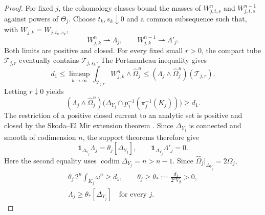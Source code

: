 \documentclass[reqno]{amsart}
\numberwithin{equation}{section}
\theoremstyle{definition}
\begin{document}
\begin{proof}
For fixed $j$, the cohomology classes bound the masses of
$W_{j,t,s}^n$ and $W_{j,t,s}^{n-1}$ against powers of
$\Theta_j$. Choose $t_k,s_k\downarrow0$ and a common subsequence
such that, with $W_{j,k}=W_{j,t_k,s_k}$,
\[
 W_{j,k}^n\rightharpoonup\Lambda_j,
 \qquad W_{j,k}^{n-1}\rightharpoonup\Lambda'_j.
\]
Both limits are positive and closed. For every fixed small $r>0$,
the compact tube $\mathcal T_{j,r}$ eventually contains
$\mathcal T_{j,s_k}$. The Portmanteau inequality gives
\[
 d_1\le\limsup_{k\to\infty}
       \int_{\mathcal T_{j,r}}W_{j,k}^n\wedge\widehat\Omega_j^n
 \le(\Lambda_j\wedge\widehat\Omega_j^n)(\mathcal T_{j,r}).
\]
Letting $r\downarrow0$ yields
\[
 (\Lambda_j\wedge\widehat\Omega_j^n)
       \bigl(\Delta_{Y_j}\cap p_1^{-1}(\pi_j^{-1}(K_j))\bigr)
       \ge d_1.
\]
The restriction of a positive closed current to an analytic set is
positive and closed by the Skoda--El Mir extension theorem
\cite[Chapter~III, Theorem~2.3]{D12}.
Since $\Delta_{Y_j}$ is connected and smooth of codimension $n$,
the support theorems
\cite[Chapter~III, Theorems~2.10 and~2.13]{D12} therefore give
\begin{equation}\label{eq:diagonal-limits}
 \mathbf1_{\Delta_{Y_j}}\Lambda_j=\theta_j[\Delta_{Y_j}],
 \qquad \mathbf1_{\Delta_{Y_j}}\Lambda'_j=0.
\end{equation}
Here the second equality uses
$\operatorname{codim}\Delta_{Y_j}=n>n-1$.
Since $\widehat\Omega_j|_{\Delta_{Y_j}}=2\Omega_j$,
\begin{equation}\label{eq:uniform-coefficient}
 \begin{gathered}
 \theta_j\,2^n\int_{K_j}\omega^n\ge d_1,
 \qquad \theta_j\ge\theta_*:=\frac{d_1}{2^nV_\beta}>0,\\
 \Lambda_j\ge\theta_*[\Delta_{Y_j}]
       \quad\text{for every }j.
 \end{gathered}
\end{equation}


\end{proof}
\end{document}
